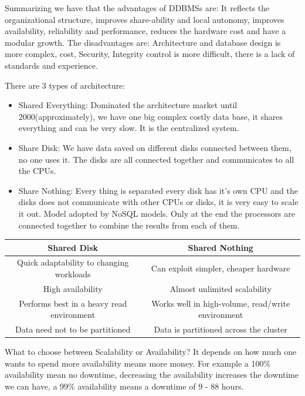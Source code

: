 \documentclass[a4page, 11pt]{article}
\begin{document}
Summarizing we have that the advantages of DDBMSs are: It reflects the organizational structure, improves share-ability and local autonomy, improves availability, reliability and performance, reduces the hardware cost and have a modular growth.
The disadvantages are: Architecture and database design is more complex, cost, Security, Integrity control is more difficult, there is a lack of standards and experience.

There are 3 types of architecture:
\begin{itemize}
\item Shared Everything: Dominated the architecture market until 2000(approximately), we have one big complex costly data base, it shares everything and can be very slow. It is the centralized system.

\item Share Disk: We have data saved on different disks connected between them, no one uses it. The disks are all connected together and communicates to all the CPUs.

\item Share Nothing: Every thing is separated every disk has it's own CPU and the disks does not communicate with other CPUs or disks, it is very easy to scale it out. Model adopted by NoSQL models. Only at the end the processors are connected together to combine the results from each of them. 
\end{itemize}

\begin{center}
	\begin{tabular}{|c|c|}
		\hline
		\textbf{Shared Disk} & \textbf{Shared Nothing}\\
		\hline
		Quick adaptability to changing workloads & Can exploit simpler, cheaper hardware\\
		\hline
		High availability & Almost unlimited scalability\\
		\hline
		Performs best in a heavy read environment & Works well in high-volume, read/write environment\\
		\hline
		Data need not to be partitioned & Data is partitioned across the cluster\\
		\hline
	\end{tabular}
\end{center}


What to choose between Scalability or Availability? It depends on how much one wants to spend more availability means more money. For example a 100\% availability mean no downtime, decreasing the availability increases the downtime we can have, a 99\% availability means a downtime of 9 - 88 hours.
\end{document}
